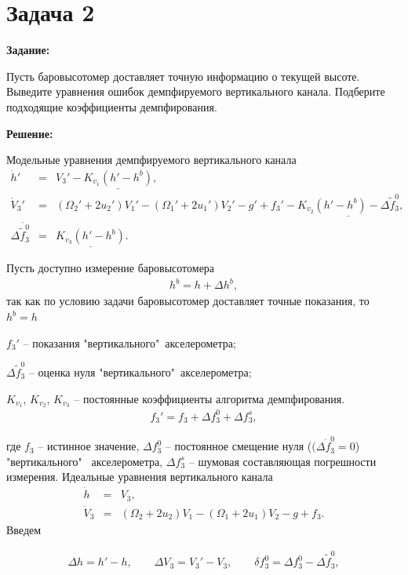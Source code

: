 \documentclass[a4paper,14pt]{article}
\theoremstyle{plain} %
\theoremstyle{definition} %
\theoremstyle{remark} %
\begin{document}
{\section{Задача 2}
\textbf{Задание:}

Пусть баровысотомер доставляет точную информацию о текущей высоте. Выведите
уравнения ошибок демпфируемого вертикального канала. Подберите подходящие
коэффициенты демпфирования.

\textbf{Решение:}

Модельные уравнения демпфируемого вертикального канала
\begin{eqnarray*}
    {\dot  h}'  &=& V_3' - \underline{K_{v_1}\left(h' - h^b\right)}, \nonumber \\
    {\dot V_3}'  &=& (\Omega_2' +  2 u_2') V_1' - (\Omega_1' +
    2u_1') V_2'- g' + f_3' - \underline{K_{v_2}\left(h' - h^b\right) - \Delta {\widetilde f}_3^0} ,\nonumber \\
    \Delta {\dot {\widetilde{f}_3^0 }}  & = & \underline{K_{v_3}\left(h' - h^b\right)}.
\end{eqnarray*}

Пусть доступно измерение баровысотомера
\begin{eqnarray*}
    h^b = h + \Delta h^b ,
\end{eqnarray*}
так как по условию задачи баровысотомер доставляет точные показания, то $h^b=h$

$f_3'$  -- показания "вертикального"\ акселерометра;

$\Delta {\widetilde f}_3^0$ -- оценка нуля "вертикального"\ акселерометра;

$K_{v_1}$, $K_{v_2}$, $K_{v_3}$  --  постоянные коэффициенты алгоритма
демпфирования.
\begin{eqnarray*}
    f_3' =  f_3 + \Delta f_3^0 + \Delta f_3^s,
\end{eqnarray*}
}
где $f_3$ -- истинное значение,
$\Delta f_3^0$ -- постоянное смещение нуля ($(\Delta {\dot f}_3^0 = 0$)  "вертикального" \ акселерометра,
$\Delta f_3^s$ --  шумовая составляющая погрешности измерения.
Идеальные уравнения вертикального канала
\begin{eqnarray*}
    {\dot  h}  &=& V_3, \nonumber \\
    {\dot V_3}  &=& (\Omega_2 +  2 u_2) V_1 - (\Omega_1 +
    2u_1) V_2- g + f_3.
\end{eqnarray*}
Введем

\begin{eqnarray*}
    \Delta h  = h' - h, \qquad \Delta V_3 = V_3' - V_3, \qquad \delta f_3^0 = \Delta f_3^0 - \Delta {\widetilde f}_3^0,
\end{eqnarray*}
\end{document}
